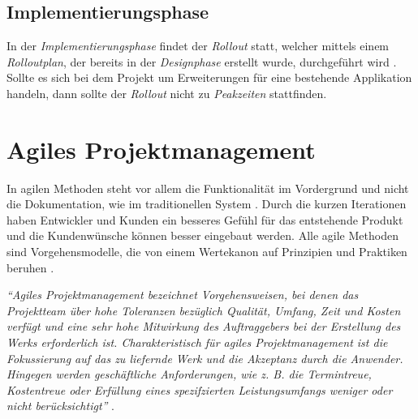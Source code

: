 \subsection{Implementierungsphase}
In der \textit{Implementierungsphase} findet der \textit{Rollout} statt, welcher mittels einem \textit{Rolloutplan}, der bereits in der \textit{Designphase} erstellt wurde, durchgeführt wird \cite{pm-wasserfall-online}. Sollte es sich bei dem Projekt um Erweiterungen für eine bestehende Applikation handeln, dann sollte der \textit{Rollout} nicht zu \textit{Peakzeiten} stattfinden.
\section{Agiles Projektmanagement}
\label{chapter:agil-pm}
In agilen Methoden steht vor allem die Funktionalität im Vordergrund und nicht die Dokumentation, wie im traditionellen System \cite{pm-agil-ursula}. Durch die kurzen Iterationen haben Entwickler und Kunden ein besseres Gefühl für das entstehende Produkt und die Kundenwünsche können besser eingebaut werden. Alle agile Methoden sind Vorgehensmodelle, die von einem Wertekanon auf Prinzipien und Praktiken beruhen \cite{pm-agil-ursula}. 
\begin{center}
	\textit{\enquote{Agiles Projektmanagement bezeichnet Vorgehensweisen, 
			bei denen das Projektteam über hohe Toleranzen bezüglich Qualität, Umfang, Zeit und Kosten verfügt und eine sehr hohe Mitwirkung des Auftraggebers bei der Erstellung des Werks erforderlich ist. Charakteristisch für agiles Projektmanagement ist die Fokussierung auf das zu liefernde Werk und die Akzeptanz durch die Anwender. Hingegen werden geschäftliche Anforderungen, wie z. B. die Termintreue, Kostentreue oder Erfüllung eines spezifzierten Leistungsumfangs weniger oder nicht berücksichtigt}}  \cite{pm-agil-magazin}.
\end{center}
